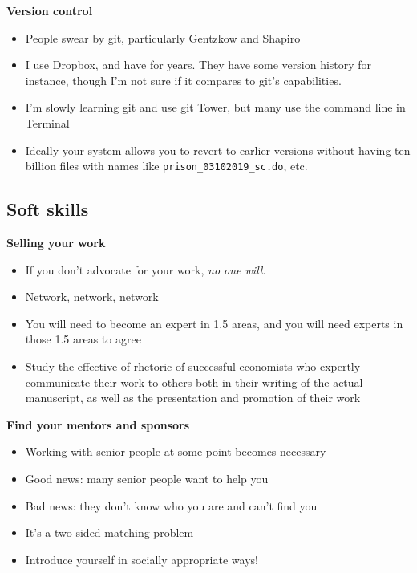 \documentclass[notes=show]{beamer}
\begin{document}
\begin{frame}[plain]
\begin{center}
\textbf{Version control}
\end{center}

\begin{itemize}
	\item People swear by git, particularly Gentzkow and Shapiro
	\item I use Dropbox, and have for years. They have some version history for instance, though I'm not sure if it compares to git's capabilities.
	\item I'm slowly learning git and use git Tower, but many use the command line in Terminal
	\item Ideally your system allows you to revert to earlier versions without having ten billion files with names like \texttt{prison\_03102019_sc.do}, etc. 
\end{itemize}

\end{frame}

\subsection{Soft skills}

\begin{frame}
\begin{center}
\textbf{Selling your work}
\end{center}

\begin{itemize}
\item If you don't advocate for your work, \emph{no one will}. 
\item Network, network, network
\item You will need to become an expert in 1.5 areas, and you will need experts in those 1.5 areas to agree
\item Study the effective of rhetoric of successful economists who expertly communicate their work to others both in their writing of the actual manuscript, as well as the presentation and promotion of their work
\end{itemize}

\end{frame}

\begin{frame}[plain]
\begin{center}
\textbf{Find your mentors and sponsors}
\end{center}

\begin{itemize}
\item Working with senior people at some point becomes necessary
\item Good news: many senior people want to help you
\item Bad news: they don't know who you are and can't find you
\item It's a two sided matching problem
\item Introduce yourself in socially appropriate ways!
\end{itemize}

\end{frame}
\end{document}
